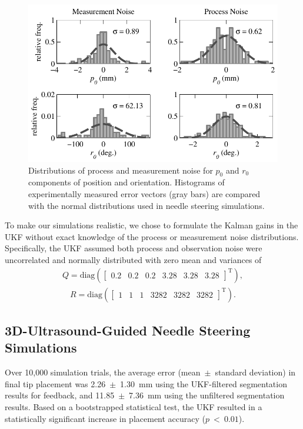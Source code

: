 \begin{figure}[!t]
\centering
\includegraphics[width=0.75\columnwidth]{Images/Chapter4/Noise/Noise}%
\caption[Distributions of process and measurement noise]{Distributions of process and measurement noise for $p_0$ and $r_0$ components of position and orientation. Histograms of experimentally measured error vectors (gray bars) are compared with the normal distributions used in needle steering simulations.}
\label{fig:Noise}
\end{figure}

To make our simulations realistic, we chose to formulate the Kalman gains in the UKF without exact knowledge of the process or measurement noise distributions. Specifically, the UKF assumed both process and observation noise were uncorrelated and normally distributed with zero mean and variances of 
\begin{align*}
{Q} = \text{diag}(\begin{bmatrix} 0.2 & 0.2 & 0.2 & 3.28 & 3.28 & 3.28 \end{bmatrix}^{\text{T}}),
\end{align*}
\begin{align*}
{R} = \text{diag}(\begin{bmatrix} 1 & 1 & 1 & 3282 & 3282 & 3282 \end{bmatrix}^{\text{T}}).
\end{align*}

\subsection{3D-Ultrasound-Guided Needle Steering Simulations}
Over 10,000 simulation trials, the average error (mean~$\pm$~standard deviation) in final tip placement was 2.26~$\pm$~1.30~mm using the UKF-filtered segmentation results for feedback, and 11.85~$\pm$~7.36~mm using the unfiltered segmentation results. Based on a bootstrapped statistical test, the UKF resulted in a statistically significant increase in placement accuracy ($p~<~0.01$).

